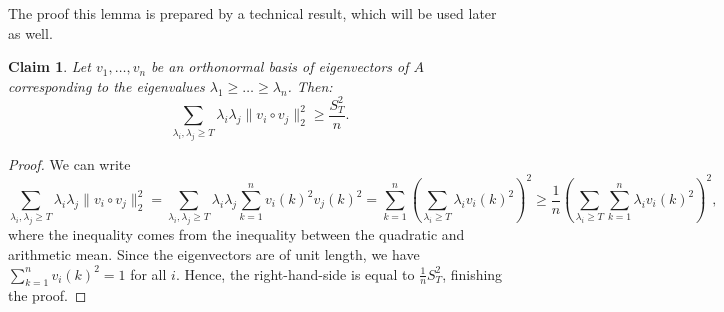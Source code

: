 \documentclass[11pt]{article}
\theoremstyle{plain}
\newtheorem{claim}[theorem]{Claim}
\theoremstyle{definition}
\begin{document}
\noindent
The proof this lemma is prepared by a technical result, which will be used later as well.

\begin{claim}\label{claim:hadamard_sum}
Let $v_1,\dots,v_n$ be an orthonormal basis of eigenvectors of $A$ corresponding to the eigenvalues $\lambda_1\geq \dots\geq \lambda_n$. Then:
    $$\sum_{\lambda_i,\lambda_j\geq T}\lambda_i\lambda_j\|v_i\circ v_j\|_2^2\geq\frac{S_T^2}{n}.$$
\end{claim}

\begin{proof} 
We can write
\begin{equation} \nonumber
    \sum_{\lambda_i,\lambda_j\geq T}\lambda_i\lambda_j\|v_i\circ v_j\|_2^2
    = \sum_{\lambda_i,\lambda_j\geq T}\lambda_i\lambda_j\sum_{k=1}^n v_i(k)^2 v_j(k)^2
    = \sum_{k=1}^n\left(\sum_{\lambda_i\geq T} \lambda_i v_{i}(k)^2\right)^2\geq \frac{1}{n}\left(\sum_{\lambda_i\geq T}\sum_{k=1}^n\lambda_i v_i(k)^2\right)^2,
\end{equation}
where the inequality comes from the inequality between the quadratic and arithmetic mean. Since the eigenvectors are of unit length, we have $\sum_{k=1}^n v_i(k)^2=1$ for all $i$. Hence, the right-hand-side is equal to $\frac{1}{n}S_T^2$, finishing the proof.
\end{proof}
\end{document}
